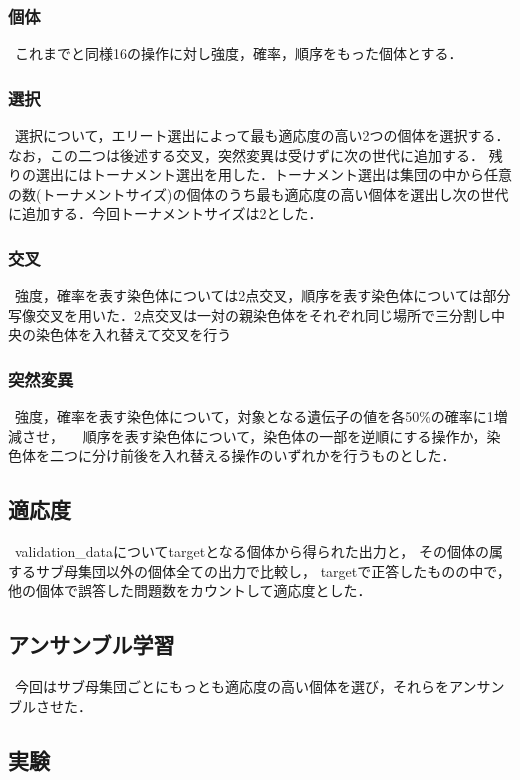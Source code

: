 \documentclass[twocolumn]{jarticle}     %
\begin{document}
\subsubsection{個体}
\ これまでと同様16の操作に対し強度，確率，順序をもった個体とする．

\subsubsection{選択}
\ 選択について，エリート選出によって最も適応度の高い2つの個体を選択する．なお，この二つは後述する交叉，突然変異は受けずに次の世代に追加する．
残りの選出にはトーナメント選出を用した．トーナメント選出は集団の中から任意の数(トーナメントサイズ)の個体のうち最も適応度の高い個体を選出し次の世代に追加する．今回トーナメントサイズは2とした．
　
\subsubsection{交叉}
\ 強度，確率を表す染色体については2点交叉，順序を表す染色体については部分写像交叉を用いた．2点交叉は一対の親染色体をそれぞれ同じ場所で三分割し中央の染色体を入れ替えて交叉を行う
　
\subsubsection{突然変異}
\ 強度，確率を表す染色体について，対象となる遺伝子の値を各50\%の確率に1増減させ，
　順序を表す染色体について，染色体の一部を逆順にする操作か，染色体を二つに分け前後を入れ替える操作のいずれかを行うものとした．
\subsection{適応度}
\ validation\_dataについてtargetとなる個体から得られた出力と，
その個体の属するサブ母集団以外の個体全ての出力で比較し，
targetで正答したものの中で，他の個体で誤答した問題数をカウントして適応度とした．

\subsection{アンサンブル学習}
\ 今回はサブ母集団ごとにもっとも適応度の高い個体を選び，それらをアンサンブルさせた．

\subsection{実験}　
\end{document}
